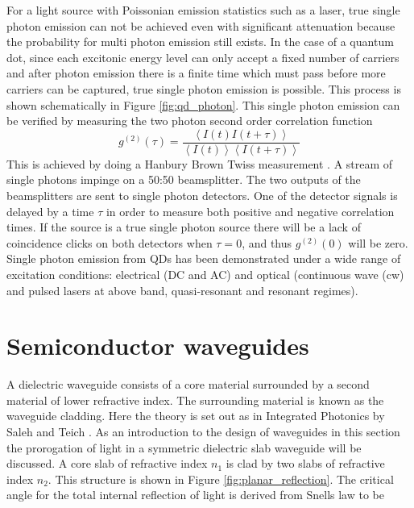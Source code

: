 For a light source with Poissonian emission statistics such as a laser, true
single photon emission can not be achieved even with significant attenuation
because the probability for multi photon emission still exists. In the case of a
quantum dot, since each excitonic energy level can only accept a fixed number of
carriers and after photon emission there is a finite time which must pass before
more carriers can be captured, true single photon emission is possible. \cite{michler2000quantum} This
process is shown schematically in Figure \ref{fig:qd_photon}. This single photon
emission can be verified by measuring the two photon second order correlation
function \begin{equation} g^{(2)}(\tau) = \frac{\left\langle I(t)I(t+\tau)
\right\rangle}{\left\langle I(t) \right\rangle \left\langle I(t+\tau)
\right\rangle} \end{equation} This is achieved by doing a Hanbury Brown Twiss
measurement \cite{brown1956test}. A stream of single photons impinge on a 50:50 beamsplitter. The two
outputs of the beamsplitters are sent to single photon detectors. One of the
detector signals is delayed by a time $\tau$ in order to measure both positive
and negative correlation times. If the source is a true single photon source
there will be a lack of coincidence clicks on both detectors when $\tau = 0$,
and thus $g^{(2)}(0)$ will be zero. Single photon emission from QDs has been
demonstrated under a wide range of excitation conditions: electrical (DC and AC)
and optical (continuous wave (cw) and pulsed lasers at above band,
quasi-resonant and resonant regimes).

\section{Semiconductor waveguides}

A dielectric waveguide consists of a core material surrounded by a second material of lower
refractive index. The surrounding material is known as the waveguide cladding.
Here the theory is set out as in Integrated Photonics by Saleh and Teich
\cite{saleh1991fundamentals}. As an introduction to the design of waveguides in
this section the prorogation of light in a symmetric dielectric slab waveguide
will be discussed. A core slab of refractive index $n_1$ is clad by two slabs of
refractive index $n_2$. This structure is shown in Figure
\ref{fig:planar_reflection}. The critical angle for the total internal
reflection of light is derived from Snells law to be

